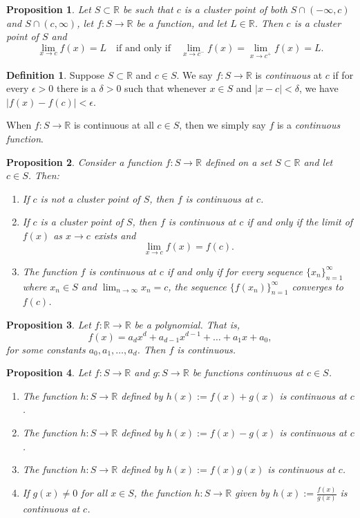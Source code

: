 \documentclass{article}
\newtheorem{proposition}{Proposition}[section]
\theoremstyle{definition}
\newtheorem{definition}{Definition}[section]
\theoremstyle{remark}
\begin{document}
\begin{proposition}
Let $S \subset \mathbb{R}$ be such that $c$ is a cluster point of both $S \cap (-\infty, c)$ and $S \cap (c, \infty)$, let $f : S \to \mathbb{R}$ be a function, and let $L \in \mathbb{R}$. Then $c$ is a cluster point of $S$ and
\[
\lim_{x\to c} f(x) = L \quad \text{if and only if} \quad \lim_{x\to c^-} f(x) = \lim_{x\to c^+} f(x) = L.
\]
\end{proposition}

\begin{definition}
Suppose $S \subset \mathbb{R}$ and $c \in S$. We say $f : S \to \mathbb{R}$ is \textit{continuous} at $c$ if for every $\epsilon > 0$ there is a $\delta > 0$ such that whenever $x \in S$ and $|x - c| < \delta$, we have $|f(x) - f(c)| < \epsilon$.

When $f : S \to \mathbb{R}$ is continuous at all $c \in S$, then we simply say $f$ is a \textit{continuous function}.
\end{definition}


\begin{proposition}
Consider a function $f : S \to \mathbb{R}$ defined on a set $S \subset \mathbb{R}$ and let $c \in S$. Then:
\begin{enumerate}
\item If $c$ is not a cluster point of $S$, then $f$ is continuous at $c$.
\item If $c$ is a cluster point of $S$, then $f$ is continuous at $c$ if and only if the limit of $f(x)$ as $x \to c$ exists and
\[
\lim_{x\to c} f(x) = f(c).
\]
\item The function $f$ is continuous at $c$ if and only if for every sequence $\{x_n\}_{n=1}^{\infty}$ where $x_n \in S$ and $\lim_{n\to\infty} x_n = c$, the sequence $\{f(x_n)\}_{n=1}^{\infty}$ converges to $f(c)$.
\end{enumerate}
\end{proposition}

\begin{proposition}
Let $f : \mathbb{R} \to \mathbb{R}$ be a polynomial. That is,
\[
f(x) = a_d x^d + a_{d-1} x^{d-1} + \dots + a_1 x + a_0,
\]
for some constants $a_0, a_1, \dots, a_d$. Then $f$ is continuous.
\end{proposition}

\begin{proposition}
Let $f : S \to \mathbb{R}$ and $g : S \to \mathbb{R}$ be functions continuous at $c \in S$.
\begin{enumerate}
\item The function $h: S \to \mathbb{R}$ defined by $h(x) := f(x) + g(x)$ is continuous at $c$.
\item The function $h: S \to \mathbb{R}$ defined by $h(x) := f(x) - g(x)$ is continuous at $c$.
\item The function $h: S \to \mathbb{R}$ defined by $h(x) := f(x)g(x)$ is continuous at $c$.
\item If $g(x) \neq 0$ for all $x \in S$, the function $h: S \to \mathbb{R}$ given by $h(x) := \frac{f(x)}{g(x)}$ is continuous at $c$.
\end{enumerate}
\end{proposition}
\end{document}
